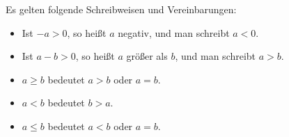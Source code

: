 Es gelten folgende Schreibweisen und Vereinbarungen:
\begin{itemize}
    \item Ist $-a > 0$, so heißt $a$ negativ, und man schreibt $a < 0$.
    \item Ist $a-b > 0$, so heißt $a$ größer als $b$, und man schreibt $a > b$.
    \item $a \geq b$ bedeutet $a > b$ oder $a = b$.
    \item $a < b$ bedeutet $b > a$.
    \item $a \leq b$ bedeutet $a < b$ oder $a = b$.
\end{itemize}